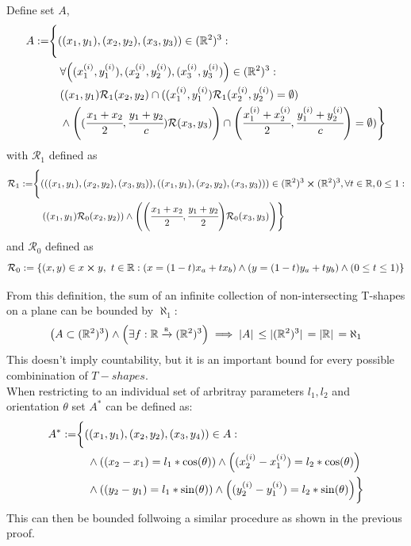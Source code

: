 \documentclass[]{article}
\newcommand{\Rel}{\mathcal{R}}
\newcommand{\R}{\mathbb{R}}
\newcommand{\toB}{\xrightarrow{\textsf{\tiny B}}}
\begin{document}
Define set $A$,
\begin{align*}
	A := &\Bigg{\{}
		((x_1,y_1),(x_2,y_2),(x_3,y_3)) \in (\R^2)^3: \\
		&\quad\forall \qty((x_1^{(i)},y_1^{(i)}),(x_2^{(i)},y_2^{(i)}),(x_3^{(i)},y_3^{(i)})) \in (\R^2)^3 : \\ 
		&\quad ((x_1,y_1)\Rel_1(x_2,y_2) \cap ((x_1^{(i)},y_1^{(i)})\Rel_1(x_2^{(i)},y_2^{(i)}) = \emptyset)\\
		&\quad \land \qty((\cfrac{x_1+x_2}{2},\cfrac{y_1+y_2}{c})\Rel(x_3,y_3)) 
			\cap \qty(\cfrac{x_1^{(i)}+x_2^{(i)}}{2},\cfrac{y_1^{(i)}+y_2^{(i)}}{c}) = \emptyset)
	\Bigg{\}}
\end{align*}
with $\Rel_1$ defined as
\begin{align*}
	\Rel_1 := &\Bigg{\{}
		\qty(((x_1,y_1),(x_2,y_2),(x_3,y_3)), ((x_1,y_1),(x_2,y_2),(x_3,y_3)))
		\in (\R^2)^3 \cross (\R^2)^3, \forall t \in \R, 0 \leq 1 : \\
			&\quad \qty((x_1,y_1) \Rel_0 (x_2,y_2)) 
			\land \qty(\qty(\cfrac{x_1 + x_2}{2}, \cfrac{y_1 + y_2}{2}) \Rel_0 (x_3,y_3))
	\Bigg{\}}
\end{align*}
and $\Rel_0$ defined as
\begin{displaymath}
	\Rel_0 := \qty{
		(x,y) \in x \cross y, \ t \in \R : 
		(x = (1-t) x_a + t x_b) \land (y = (1-t) y_a + t y_b)
		\land (0 \leq t \leq 1)
	}
\end{displaymath}

From this definition, the sum of an infinite collection of non-intersecting T-shapes on a plane
can be bounded by $\aleph_1$:
\begin{displaymath}
	\qty(A \subset (\R^2)^3) \land \qty(\exists f: \R \toB (\R^2)^3) 
		\implies \abs*{A} \leq \abs*{(\R^2)^3} = \abs*{\R} = \aleph_1
\end{displaymath}
This doesn't imply countability, but it is an important bound for every possible 
combinination of $T-shapes$.\\

When restricting to an individual set of arbritray parameters $l_1, l_2$ and orientation $\theta$ 
set $A^*$ can be defined as:
\begin{align*}
	A^* := &\bigg{\{}
		((x_1,y_1),(x_2,y_2),(x_3,y_4)) \in A : \\
		&\quad \land \qty((x_2 - x_1) = l_1 * \cos(\theta))
			\land \qty((x_2^{(i)} - x_1^{(i)}) = l_2 * \cos(\theta))\\
		&\quad \land \qty((y_2 - y_1) = l_1 * \sin(\theta))
			\land \qty((y_2^{(i)} - y_1^{(i)}) = l_2 * \sin(\theta))
	\bigg{\}}
\end{align*}
This can then be bounded follwoing a similar procedure as shown in the previous proof.
\end{document}
